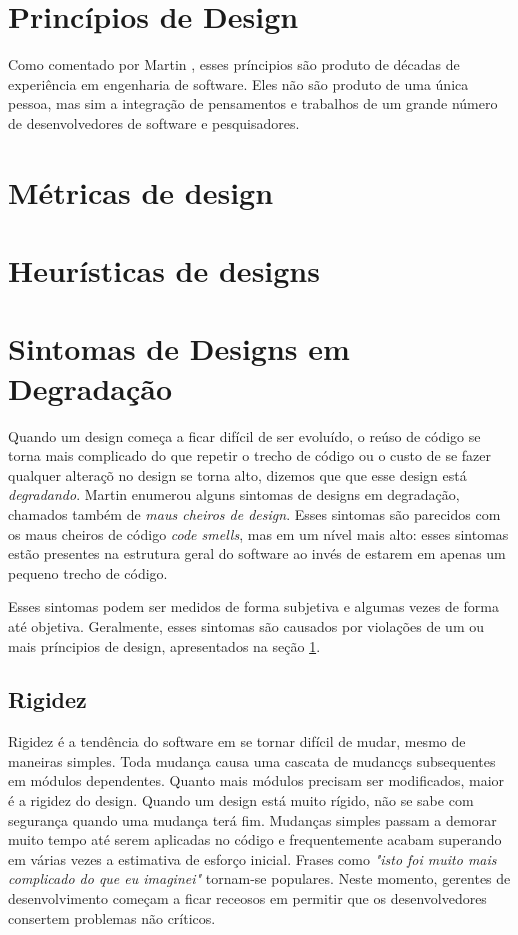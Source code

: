 \section{Princípios de Design}
\label{sec:design-oo-principios}


Como comentado por Martin \cite{bob-martin}, esses príncipios são produto de décadas de experiência em engenharia de software.
Eles não são produto de uma única pessoa, mas sim a integração de pensamentos e trabalhos de um grande número de
desenvolvedores de software e pesquisadores.

\section{Métricas de design}

\section{Heurísticas de designs}

\section{Sintomas de Designs em Degradação}

Quando um design começa a ficar difícil de ser evoluído, o reúso de código se torna mais complicado do que repetir o trecho de código ou 
o custo de se fazer qualquer alteraçõ no design se torna alto, dizemos que que esse design está \textit{degradando}. 
Martin \cite{bob-martin} enumerou alguns sintomas de designs em degradação, chamados também de \textit{maus cheiros de design}. 
Esses sintomas são parecidos com os maus cheiros de código \textit{code smells}, mas em um nível mais alto: esses sintomas
estão presentes na estrutura geral do software ao invés de estarem em apenas um pequeno trecho de código.

Esses sintomas podem ser medidos de forma subjetiva e algumas vezes de forma até objetiva. Geralmente, esses sintomas são causados
por violações de um ou mais príncipios de design, apresentados na seção \ref{sec:design-oo-principios}. 

\subsection{Rigidez}

Rigidez é a tendência do software em se tornar difícil de mudar, mesmo de maneiras simples. Toda mudança causa uma cascata de mudancçs subsequentes em módulos dependentes. Quanto mais módulos precisam ser modificados, maior é a rigidez do design. Quando um design está muito rígido, não se sabe com segurança quando uma mudança terá fim. Mudanças simples passam a demorar muito tempo até serem aplicadas no código e frequentemente acabam superando em várias vezes a estimativa de esforço inicial. Frases como \textit{"isto foi muito mais complicado do que eu imaginei"} tornam-se populares. Neste momento, gerentes de desenvolvimento começam a ficar receosos em permitir que os desenvolvedores consertem problemas não críticos.


